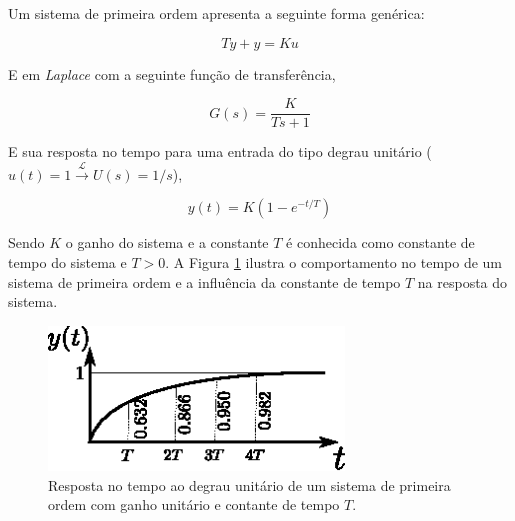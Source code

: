 Um sistema de primeira ordem apresenta a seguinte forma genérica:

\begin{equation}
    T\dot{y} + y = Ku
\end{equation}

E em \emph{Laplace} com a seguinte função de transferência,

\begin{equation}
    G(s) = \frac{K}{Ts + 1}
\end{equation}

E sua resposta no tempo para uma entrada do tipo degrau unitário ($u(t) = 1 \xrightarrow{\mathscr{L}} U(s) = 1/s$),

\begin{equation}
    y(t) = K \left(1 - e^{-t/T} \right)
\end{equation}

Sendo $K$ o ganho do sistema e a constante $T$ é conhecida como constante de tempo do sistema e $T > 0$. A Figura \ref{fig:saida_sistema_primeira_ordem_no_tempo} ilustra o comportamento no tempo de um sistema de primeira ordem e a influência da constante de tempo $T$ na resposta do sistema.

\begin{figure}[H]
    \centering
    \includegraphics[width=0.7\textwidth]{imagens/ilustracoes/resposta_no_tempo_sistema_primeira_ordem.eps}
    \caption{Resposta no tempo ao degrau unitário de um sistema de primeira ordem com ganho unitário e contante de tempo $T$.}
    \label{fig:saida_sistema_primeira_ordem_no_tempo}
\end{figure}

